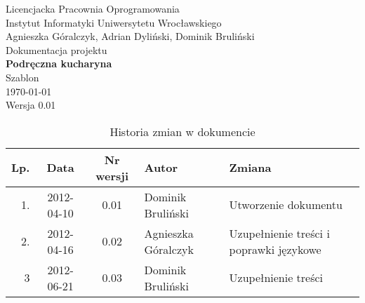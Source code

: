 \documentclass[12pt,leqno, twoside]{mwart}
\begin{document}
\thispagestyle{empty}
\begin{center}
Licencjacka Pracownia Oprogramowania \\ Instytut
Informatyki Uniwersytetu Wrocławskiego \\
\vspace{4cm}
\Large Agnieszka Góralczyk, Adrian Dyliński, Dominik Bruliński \\
\vspace{0.5cm}
\huge Dokumentacja projektu\\ \textbf{Podręczna kucharyna}\\ \Large Szablon\\
\vspace{1cm}
\normalsize \today \\
\vspace{2cm}
\normalsize Wersja 0.01
\end{center}

\newpage




\begin{table}
	\centering
	\caption{Historia zmian w dokumencie}
		\begin{tabular}{|r|c|c|l|l|}
		\hline
		Lp. & Data       & Nr wersji & Autor               & Zmiana \\ \hline
		1.   & 2012-04-10 & 0.01 & Dominik Bruliński & Utworzenie dokumentu \\ \hline
		2. & 2012-04-16 & 0.02 & Agnieszka Góralczyk & Uzupełnienie treści i poprawki językowe\\ \hline
		3 & 2012-06-21 & 0.03 & Dominik Bruliński & Uzupełnienie treści \\ \hline
		\end{tabular}
\end{table}

\newpage

\tableofcontents
\newpage
\end{document}
